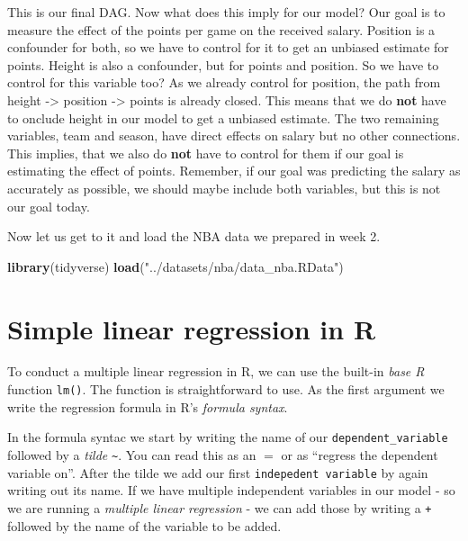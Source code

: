 \documentclass[
]{book}
\newenvironment{Shaded}{\begin{snugshade}}{\end{snugshade}}
\newcommand{\FunctionTok}[1]{\textcolor[rgb]{0.13,0.29,0.53}{\textbf{#1}}}
\newcommand{\NormalTok}[1]{#1}
\newcommand{\StringTok}[1]{\textcolor[rgb]{0.31,0.60,0.02}{#1}}
\begin{document}
This is our final DAG. Now what does this imply for our model?
Our goal is to measure the effect of the points per game on the received
salary. Position is a confounder for both, so we have to control for it to get
an unbiased estimate for points. Height is also a confounder, but for points
and position. So we have to control for this variable too? As we already control
for position, the path from height -\textgreater{} position -\textgreater{} points is already closed. This
means that we do \textbf{not} have to onclude height in our model to get a unbiased
estimate. The two remaining variables, team and season, have direct effects on
salary but no other connections. This implies, that we also do \textbf{not} have to
control for them if our goal is estimating the effect of points. Remember, if
our goal was predicting the salary as accurately as possible, we should maybe
include both variables, but this is not our goal today.

Now let us get to it and load the NBA data we prepared in week 2.

\begin{Shaded}
\begin{Highlighting}[]
\FunctionTok{library}\NormalTok{(tidyverse)}
\FunctionTok{load}\NormalTok{(}\StringTok{"../datasets/nba/data\_nba.RData"}\NormalTok{)}
\end{Highlighting}
\end{Shaded}

\hypertarget{simple-linear-regression-in-r}{%
\section{Simple linear regression in R}\label{simple-linear-regression-in-r}}

To conduct a multiple linear regression in R, we can use the built-in \emph{base R}
function \texttt{lm()}. The function is straightforward to use. As the first argument
we write the regression formula in R's \emph{formula syntax}.

In the formula syntac we start by writing the name of our \texttt{dependent\_variable}
followed by a \emph{tilde} \texttt{\textasciitilde{}}. You can read this as an \(=\) or as ``regress the
dependent variable on''. After the tilde we add our first \texttt{indepedent\ variable}
by again writing out its name. If we have multiple independent variables in our
model - so we are running a \emph{multiple linear regression} - we can add those by
writing a \texttt{+} followed by the name of the variable to be added.
\end{document}
